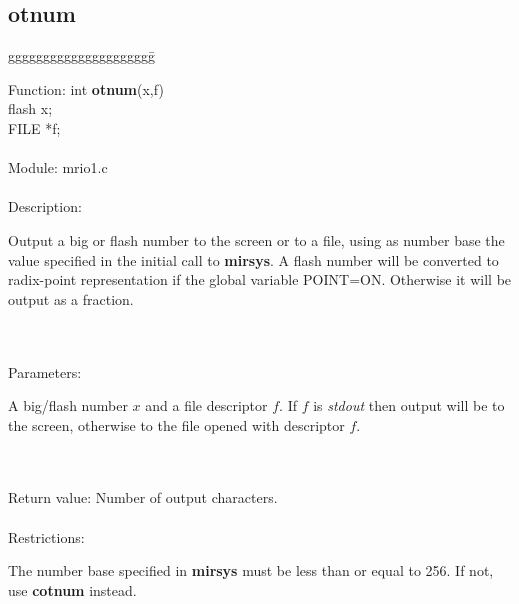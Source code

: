 \subsection{otnum}

\begin{tabbing}
ggggggggggggggggggggg\= \kill


      Function:      \>int {\bf otnum}(x,f) \\
                     \>flash x; \\
                     \>FILE *f; \\
      \ \\
      Module:        \>mrio1.c \\
      \ \\
      Description:   \>
                     \parbox[t]{3in}
                     {Output a big or flash number to the screen or to a 
                      file, using as number base the value specified in the
                      initial call to {\bf mirsys}.
                     A flash number will be converted to radix-point
                     representation if the global variable POINT=ON. Otherwise
                     it will be output as a fraction.} \\
      \ \\
      Parameters:    \>
                     \parbox[t]{3in}
                     {A big/flash number $x$ and a file descriptor $f$. If $f$ is
                     {\em stdout} then output will be to the screen, otherwise to
                     the file opened with descriptor $f$.} \\
      \ \\
      Return value:  \>Number of output characters. \\
      \ \\
      Restrictions:  \>
                     \parbox[t]{3 in}
                     {The number base specified in {\bf mirsys} must be less 
                     than or equal to 256. If not, use {\bf cotnum} 
                     instead.} \\


\end{tabbing}

\pagebreak
